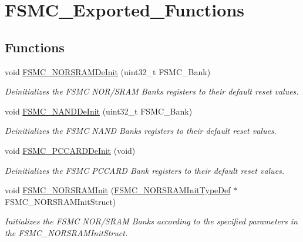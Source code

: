\hypertarget{group___f_s_m_c___exported___functions}{}\section{F\+S\+M\+C\+\_\+\+Exported\+\_\+\+Functions}
\label{group___f_s_m_c___exported___functions}
\subsection*{Functions}
\begin{DoxyCompactItemize}
\item 
void \mbox{\hyperlink{group___f_s_m_c___exported___functions_gaab3e6648e8a584e73785361ac960eded}{F\+S\+M\+C\+\_\+\+N\+O\+R\+S\+R\+A\+M\+De\+Init}} (uint32\+\_\+t F\+S\+M\+C\+\_\+\+Bank)
\begin{DoxyCompactList}\small\item\em Deinitializes the F\+S\+MC N\+O\+R/\+S\+R\+AM Banks registers to their default reset values. \end{DoxyCompactList}\item 
void \mbox{\hyperlink{group___f_s_m_c___exported___functions_gafb749503293474a68555961bd8f120e1}{F\+S\+M\+C\+\_\+\+N\+A\+N\+D\+De\+Init}} (uint32\+\_\+t F\+S\+M\+C\+\_\+\+Bank)
\begin{DoxyCompactList}\small\item\em Deinitializes the F\+S\+MC N\+A\+ND Banks registers to their default reset values. \end{DoxyCompactList}\item 
void \mbox{\hyperlink{group___f_s_m_c___exported___functions_ga2f53ccf3a4f3c80a5a56fb47ccd47ccd}{F\+S\+M\+C\+\_\+\+P\+C\+C\+A\+R\+D\+De\+Init}} (void)
\begin{DoxyCompactList}\small\item\em Deinitializes the F\+S\+MC P\+C\+C\+A\+RD Bank registers to their default reset values. \end{DoxyCompactList}\item 
void \mbox{\hyperlink{group___f_s_m_c___exported___functions_ga9c27816e8b17394c9ee1ce9298917b4a}{F\+S\+M\+C\+\_\+\+N\+O\+R\+S\+R\+A\+M\+Init}} (\mbox{\hyperlink{struct_f_s_m_c___n_o_r_s_r_a_m_init_type_def}{F\+S\+M\+C\+\_\+\+N\+O\+R\+S\+R\+A\+M\+Init\+Type\+Def}} $\ast$F\+S\+M\+C\+\_\+\+N\+O\+R\+S\+R\+A\+M\+Init\+Struct)
\begin{DoxyCompactList}\small\item\em Initializes the F\+S\+MC N\+O\+R/\+S\+R\+AM Banks according to the specified parameters in the F\+S\+M\+C\+\_\+\+N\+O\+R\+S\+R\+A\+M\+Init\+Struct. \end{DoxyCompactList}\item 

\end{DoxyCompactItemize}
